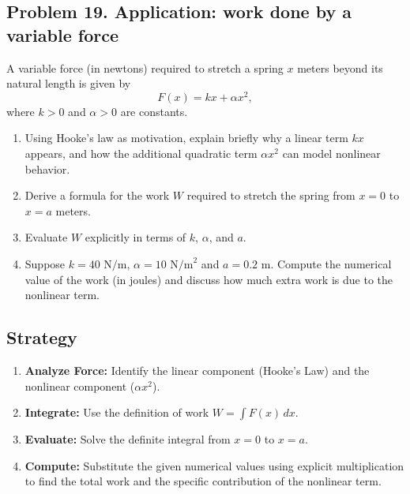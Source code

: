 \subsection{Problem 19. Application: work done by a variable force}
A variable force (in newtons) required to stretch a spring $x$ meters beyond its natural length is given by
\[F(x)=kx+\alpha x^{2},\]
where $k>0$ and $\alpha>0$ are constants.
\begin{enumerate}[label=(\alph*)]
    \item Using Hooke's law as motivation, explain briefly why a linear term $kx$ appears, and how the additional quadratic term $\alpha x^{2}$ can model nonlinear behavior.
    \item Derive a formula for the work $W$ required to stretch the spring from $x=0$ to $x=a$ meters.
    \item Evaluate $W$ explicitly in terms of $k$, $\alpha$, and $a$.
    \item Suppose $k=40\text{ N/m}$, $\alpha=10\text{ N/m}^{2}$ and $a=0.2\text{ m}$. Compute the numerical value of the work (in joules) and discuss how much extra work is due to the nonlinear term.
\end{enumerate}

\subsection*{Strategy}
\begin{enumerate}[label = (\alph*)]
    \item \textbf{Analyze Force:} Identify the linear component (Hooke's Law) and the nonlinear component ($ \alpha x^2 $).
    \item \textbf{Integrate:} Use the definition of work $W = \int F(x) \, dx$.
    \item \textbf{Evaluate:} Solve the definite integral from $x=0$ to $x=a$.
    \item \textbf{Compute:} Substitute the given numerical values using explicit multiplication to find the total work and the specific contribution of the nonlinear term.
\end{enumerate}
